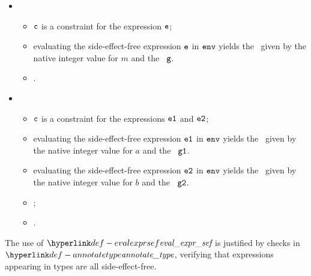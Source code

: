 \ProseParagraph
\OneApplies
\begin{itemize}
  \item {}
  \begin{itemize}
    \item $\vc$ is a constraint for the expression $\ve$;
    \item evaluating the side-effect-free expression $\ve$ in $\env$ yields the \concurrentnativevalue\ given
          by the native integer value for $m$ and the \executiongraph\ $\vg$\ProseOrDynErrorDiverging.
    \item {}.
  \end{itemize}

  \item {}
  \begin{itemize}
    \item $\vc$ is a constraint for the expressions $\veone$ and $\vetwo$;
    \item evaluating the side-effect-free expression $\veone$ in $\env$ yields the \concurrentnativevalue\ given
          by the native integer value for $a$ and the \executiongraph\ $\vgone$\ProseOrDynErrorDiverging.
    \item evaluating the side-effect-free expression $\vetwo$ in $\env$ yields the \concurrentnativevalue\ given
          by the native integer value for $b$ and the \executiongraph\ $\vgtwo$\ProseOrDynErrorDiverging.
    \item {};
    \item {}.
  \end{itemize}
\end{itemize}

\FormallyParagraph
The use of $\evalexprsef$ is justified by checks in $\annotatetype$, verifying
that expressions appearing in types are all side-effect-free.

\begin{mathpar}
\end{mathpar}

\begin{mathpar}
\end{mathpar}

